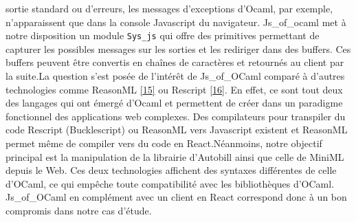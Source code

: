 \documentclass[12pt]{article}
\begin{document}
\begin{itemize}
                  sortie standard ou d'erreurs, les messages d'exceptions d'Ocaml, par
                  exemple, n'apparaissent que dans la console Javascript du navigateur.
                  Js\_of\_ocaml met à notre disposition un module \texttt{Sys\_js} qui
                  offre des primitives permettant de capturer les possibles messages sur
                  les sorties et les rediriger dans des buffers. Ces buffers peuvent
                  être convertis en chaînes de caractères et retournés au client par la
                  suite.\newline  La question s'est posée de l'intérêt de Js\_of\_OCaml
                  comparé à d'autres technologies comme ReasonML
                  \protect\hyperlink{ref-reasonml}{{[}15{]}} ou Rescript
                  \protect\hyperlink{ref-rescript}{{[}16{]}}. En effet, ce sont tout
                  deux des langages qui ont émergé d'Ocaml et permettent de créer dans
                  un paradigme fonctionnel des applications web complexes. Des
                  compilateurs pour transpiler du code Rescript (Bucklescript) ou
                  ReasonML vers Javascript existent et ReasonML permet même de compiler
                  vers du code en React.\newline  Néanmoins, notre objectif principal
                  est la manipulation de la librairie d'Autobill ainsi que celle de
                  MiniML depuis le Web. Ces deux technologies affichent des syntaxes
                  différentes de celle d'OCaml, ce qui empêche toute compatibilité avec
                  les bibliothèques d'OCaml. Js\_of\_OCaml en complément avec un client
                  en React correspond donc à un bon compromis dans notre cas d'étude.
      \end{itemize}
\end{document}
